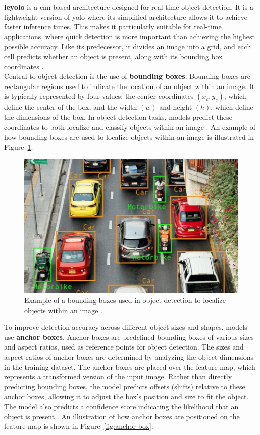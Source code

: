 \textbf{\gls{leyolo}} is a \gls{cnn}-based architecture designed for real-time object detection. It is a lightweight version of \gls{yolo} where its simplified architecture allows it to achieve faster inference times. This makes it particularly suitable for real-time applications, where quick detection is more important than achieving the highest possible accuracy. Like its predecessor, it divides an image into a grid, and each cell predicts whether an object is present, along with its bounding box coordinates \cite{openreview:leyolo}.\\

Central to object detection is the use of \textbf{bounding boxes}. Bounding boxes are rectangular regions used to indicate the location of an object within an image. It is typically represented by four values: the center coordinates \((x_c, y_c)\), which define the center of the box, and the width \((w)\) and height \((h)\), which define the dimensions of the box. In object detection tasks, models predict these coordinates to both localize and classify objects within an image \cite{peopleforai:boundingbox}. An example of how bounding boxes are used to localize objects within an image is illustrated in Figure~\ref{fig:boundingbox}.

\begin{figure}[h!]
    \centering
    \includegraphics[width=0.75\linewidth]{figures/theory/image-recognition/bbox-example.png}
    \caption[Bounding box in object detection]{Example of a bounding boxes used in object detection to localize objects within an image \cite{peopleforai:boundingbox}.}
    \label{fig:boundingbox}
\end{figure}

To improve detection accuracy across different object sizes and shapes, models use \textbf{anchor boxes}. Anchor boxes are predefined bounding boxes of various sizes and aspect ratios, used as reference points for object detection. The sizes and aspect ratios of anchor boxes are determined by analyzing the object dimensions in the training dataset. The anchor boxes are placed over the feature map, which represents a transformed version of the input image. Rather than directly predicting bounding boxes, the model predicts offsets (shifts) relative to these anchor boxes, allowing it to adjust the box's position and size to fit the object. The model also predicts a confidence score indicating the likelihood that an object is present \cite{thinkautonomous:anchorboxes}. An illustration of how anchor boxes are positioned on the feature map is shown in Figure~\ref{fig:anchor-box}.

